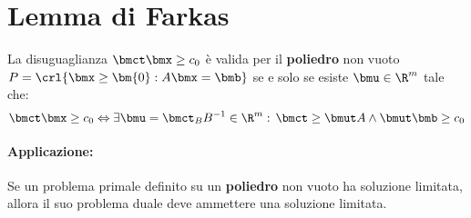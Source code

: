 \documentclass[\main/main.tex]{subfiles}
\begin{document}
\section{Lemma di Farkas}

\begin{theorem}
  \label{lemma_farkas}
  La disuguaglianza $\bmct\bmx \geq c_0$ è valida per il \textbf{poliedro} non vuoto $P=\crl{\bmx\geq\bm{0}:A\bmx=\bmb}$ se e solo se esiste $\bmu \in \R^m$ tale che:
  \[
    \bmct \bmx \geq c_0 \Leftrightarrow \exists \bmu = \bmct_B B^{-1} \in \R^m:\, \bmct \geq \bmut A \land \bmut \bmb \geq c_0
  \]
  \paragraph*{Applicazione:} Se un problema primale definito su un \textbf{poliedro} non vuoto ha soluzione limitata, allora il suo problema duale deve ammettere una soluzione limitata.
\end{theorem}
\end{document}
